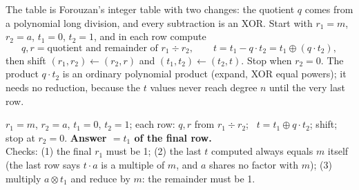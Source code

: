 The table is Forouzan's integer table with two changes: the quotient $q$ comes from a polynomial long division, and every subtraction is an XOR. Start with $r_1 = m$, $r_2 = a$, $t_1 = 0$, $t_2 = 1$, and in each row compute
\[
q, r = \text{quotient and remainder of } r_1 \div r_2, \qquad t = t_1 - q \cdot t_2 = t_1 \oplus (q \cdot t_2),
\]
then shift $(r_1, r_2) \leftarrow (r_2, r)$ and $(t_1, t_2) \leftarrow (t_2, t)$. Stop when $r_2 = 0$. The product $q \cdot t_2$ is an ordinary polynomial product (expand, XOR equal powers); it needs no reduction, because the $t$ values never reach degree $n$ until the very last row.

\begin{mustknow}
$r_1 = m$, $r_2 = a$, $t_1 = 0$, $t_2 = 1$; each row: $q, r$ from $r_1 \div r_2$; \ $t = t_1 \oplus q \cdot t_2$; shift; stop at $r_2 = 0$. \textbf{Answer $= t_1$ of the final row.}\\
Checks: (1) the final $r_1$ must be 1; (2) the last $t$ computed always equals $m$ itself (the last row says $t \cdot a$ is a multiple of $m$, and $a$ shares no factor with $m$); (3) multiply $a \otimes t_1$ and reduce by $m$: the remainder must be 1.
\end{mustknow}

